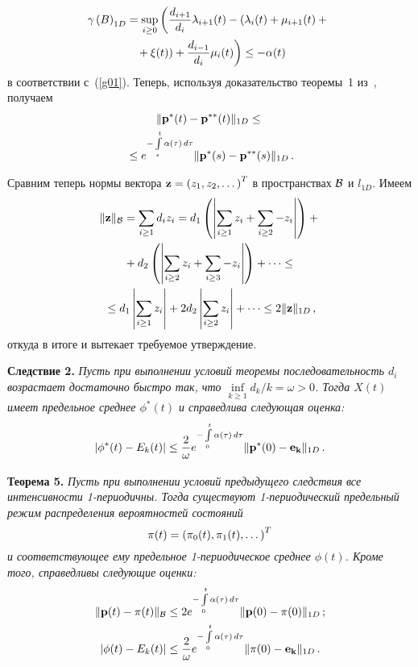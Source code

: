 \begin{multicols}{2}
\noindent
\begin{multline*}
\gamma \left(B\right)_{1D} = \sup\limits_{i \ge 0}
\left(\displaystyle\frac{\displaystyle d_{i+1}\mathstrut}{\displaystyle d_i\mathstrut}
 \lambda_{i+1}(t) - \left(\lambda_i(t) +\mu_{i+1}(t)
+{}\right.\right.\\
\left.\left. {}+\xi(t)\right) +  \displaystyle\frac{\displaystyle d_{i-1}\mathstrut}{\displaystyle d_i\mathstrut} \mu_i(t) \right) 
\le -
\alpha(t) 
\end{multline*}
в соответствии с~(\ref{g01}). Теперь, используя
доказательство теоремы~1 из~\cite{z06}, получаем
\begin{multline*}
\|{\bf p^*}(t) - {\bf p^{**}}(t)\|_{1D}  \le {}\\
{}\le  e^{-\int\limits_s^t
\alpha(\tau)\, d\tau}\|{\bf p^*}(s) - {\bf p^{**}}(s)\|_{1D}\,.
\end{multline*}

Сравним теперь нормы вектора ${\bf z} = \left(z_1, z_2, \dots
\right)^T$ в пространствах  $\cal B$ и $l_{1D}$. Имеем
\begin{multline*}
\|{\bf z}\|_{\cal B} = \sum_{i \ge 1} d_iz_i =
d_1\left(\left|\sum_{i \ge 1} z_i + \sum_{i \ge 2} -
z_i\right|\right) +{}\\
{}+ d_2\left(\left|\sum_{i \ge 2} z_i + \sum_{i \ge
3} - z_i\right|\right) + \dots \le{}  \\
{}\le d_1\left|\sum_{i \ge
1} z_i \right| + 2d_2\left|\sum_{i \ge 2} z_i \right| + \dots \le
2\|{\bf z}\|_{1D}\,, 
\end{multline*}
откуда в итоге и вытекает требуемое утверждение.

\smallskip

\noindent
\textbf{Следствие 2.}
\textit{Пусть при выполнении условий теоремы последовательность $d_i$
возрастает достаточно быстро так, что $\inf\limits_{k \ge 1}
d_k/k = \omega > 0$. Тогда $X(t)$ имеет предельное среднее
 $\phi^*(t)$ и справедлива следующая оценка:}
\begin{equation*}
\left|\phi^*(t) - E_k(t)\right| \le \displaystyle\frac{\displaystyle 2\mathstrut}{\displaystyle \omega\mathstrut}
e^{-\int\limits_0^t \alpha(\tau)\, d\tau}\|{\bf p^*}(0) - {\bf
e_k}\|_{1D}\,. 
\end{equation*}

\medskip


\noindent
\textbf{Теорема 5.}
\textit{Пусть при выполнении условий предыду\-щего следствия все интенсивности
1-периодичны. Тогда существуют 1-периодический предельный режим
распределения вероятностей состояний  
$$
{\bf \pi}(t) = \left(\pi_0(t),\pi_1(t),\dots\right)^T
$$ 
и соответствующее ему
предельное 1-периодическое среднее $\phi(t)$. Кроме того,
справедливы следующие оценки:}
\begin{align}
\|{\bf p}(t) - {\bf \pi}(t)\|_{\cal B}&  \le 2 e^{-\int\limits_0^t
\alpha(\tau)\, d\tau}\|{\bf p}(0) - {\bf \pi}(0)\|_{1D}\,; \label{g09}\\
\left|\phi(t) - E_k(t)\right| & \le \displaystyle\frac{\displaystyle 2\mathstrut}{\displaystyle \omega\mathstrut}
e^{-\int\limits_0^t \alpha(\tau)\, d\tau}\|{\bf \pi}(0) - {\bf
e_k}\|_{1D}\,. \label{g10}
\end{align}



\end{multicols}
